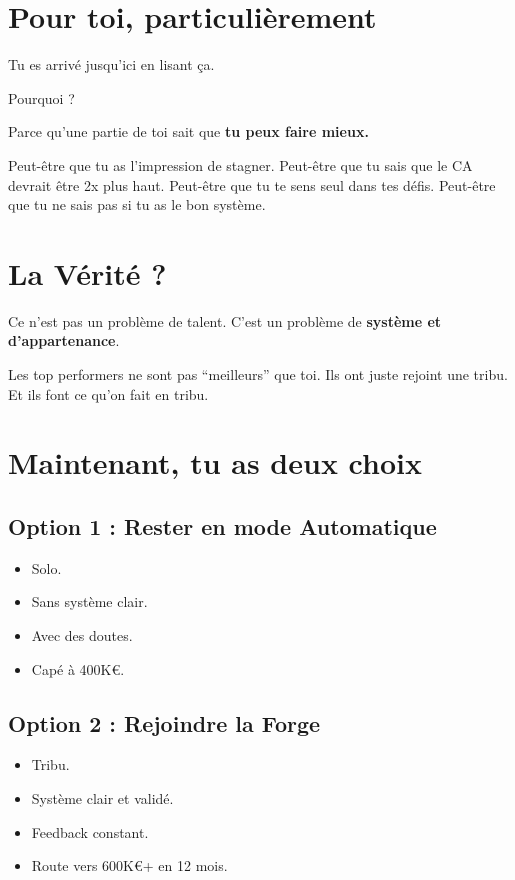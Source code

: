 \documentclass[12pt,a4paper,openany]{book}
\begin{document}
\section*{Pour toi, particulièrement}

Tu es arrivé jusqu'ici en lisant ça.

Pourquoi ?

Parce qu'une partie de toi sait que \textbf{tu peux faire mieux.}

Peut-être que tu as l'impression de stagner.
Peut-être que tu sais que le CA devrait être 2x plus haut.
Peut-être que tu te sens seul dans tes défis.
Peut-être que tu ne sais pas si tu as le bon système.

\section*{La Vérité ?}

Ce n'est pas un problème de talent. C'est un problème de \textbf{système et d'appartenance}.

Les top performers ne sont pas ``meilleurs'' que toi.
Ils ont juste rejoint une tribu.
Et ils font ce qu'on fait en tribu.

\section*{Maintenant, tu as deux choix}

\subsection*{Option 1 : Rester en mode Automatique}

\begin{itemize}
\item Solo.
\item Sans système clair.
\item Avec des doutes.
\item Capé à 400K\euro{}.
\end{itemize}

\subsection*{Option 2 : Rejoindre la Forge}

\begin{itemize}
\item Tribu.
\item Système clair et validé.
\item Feedback constant.
\item Route vers 600K\euro{}+ en 12 mois.
\end{itemize}
\end{document}
